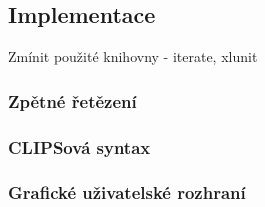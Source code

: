 \subsection{Implementace}



\begin{framed}
  Zmínit použité knihovny - iterate, xlunit
\end{framed}






\subsubsection{Zpětné řetězení}
\subsubsection{CLIPSová syntax}
\subsubsection{Grafické uživatelské rozhraní}
